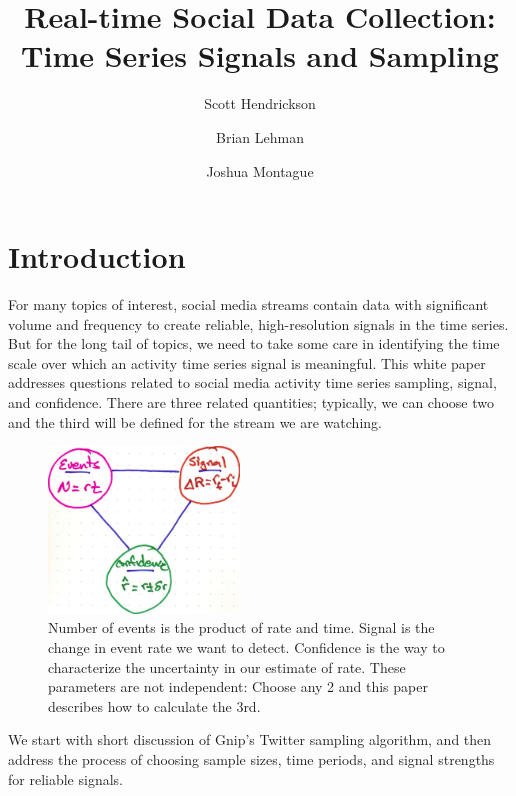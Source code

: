 \documentclass{article}
\title{Real-time Social Data Collection: \\ \Large{Time Series Signals and Sampling} }
\author[]{Scott Hendrickson}
\author[]{Brian Lehman}
\author[]{Joshua Montague}
\affil[]{ \Large{Gnip, Inc.} }
\begin{document}
\maketitle


\section{Introduction}

For many topics of interest, social media streams contain data with significant volume and frequency to create reliable, high-resolution signals in the time series.  But for the 
long tail of topics, we need to take some care in identifying the 
time scale over which an activity time series signal is meaningful. This white paper addresses questions related to social media activity time series sampling, signal, and confidence. There are three related quantities; typically, we can choose two and the third will be defined for the stream we are watching.


%
\begin{figure}[h]
	\begin{center}
		\includegraphics[width=2.0in]{./imgs/tradeoff.jpg}
	\end{center}
	\caption{Number of events is the product of rate and time. Signal is the change in event rate we want to detect.  Confidence is the way to characterize the
	uncertainty in our estimate of rate.  These parameters are not independent: Choose any 2 and this paper describes how to calculate the 3rd. }
    	\label{fig:tradeoff}
\end{figure}
%
%


We start with short discussion of Gnip's Twitter sampling algorithm, and then address the process of choosing sample sizes, time periods, and signal strengths for reliable signals.
\end{document}
